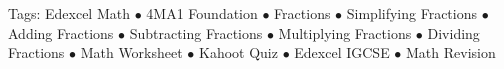 \documentclass[11pt,a4paper]{article}
\begin{document}
\vspace{14pt}
\begin{center}
  \sffamily\scriptsize\textcolor{textmuted}{
    Tags: Edexcel Math $\bullet$ 4MA1 Foundation $\bullet$ Fractions $\bullet$ Simplifying Fractions $\bullet$ Adding Fractions $\bullet$ Subtracting Fractions $\bullet$ Multiplying Fractions $\bullet$ Dividing Fractions $\bullet$ Math Worksheet $\bullet$ Kahoot Quiz $\bullet$ Edexcel IGCSE $\bullet$ Math Revision
  }
\end{center}
\end{document}

